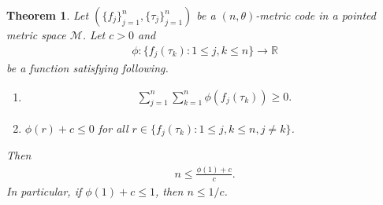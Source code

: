 \documentclass{amsart}
\newtheorem{theorem}{Theorem}[section]
\begin{document}
\begin{theorem}
	Let $ (\{f_j \}_{j=1}^n, \{\tau_j \}_{j=1}^n) $  be a  $(n,\theta )$-metric  code in a  pointed metric space $\mathcal{M}$. Let $c>0$ and 
	\begin{align*}
		\phi:\{f_j(\tau_k):1\leq j, k \leq n\}\to \mathbb{R}	
	\end{align*}
	be a function satisfying following.
	\begin{enumerate}[\upshape(i)]
		\item 
		\begin{align*}
			\sum_{j=1}^n\sum_{k =1}^n\phi(f_j(\tau_k))\geq 0.	
		\end{align*}
		\item $\phi(r)+c\leq 0$ for all $ r \in \{f_j(\tau_k):1\leq j, k \leq n, j \neq k\}$.
	\end{enumerate}
	Then 
	\begin{align*}
		n\leq \frac{\phi(1)+c}{c}.
	\end{align*}
	In particular, if $\phi(1)+c\leq 1$, then $n\leq 1/c$.	
\end{theorem}
	




		





























 
 
 
\end{document}
